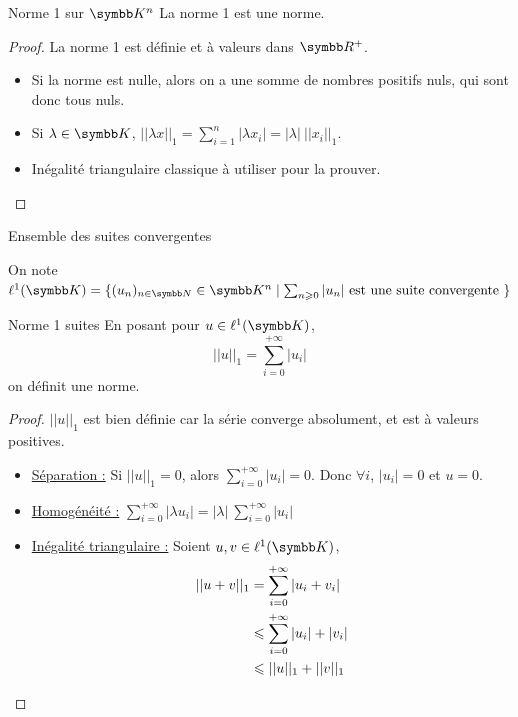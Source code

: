 \begin{theoreme}{Norme 1 sur $\K^n$}{}
    La norme 1 est une norme.
\end{theoreme}

\begin{proof}
    La norme 1 est définie et à valeurs dans $\R^+$. 

    \begin{itemize}
        \item Si la norme est nulle, alors on a une somme de nombres positifs nuls, qui sont donc tous nuls. 
        \item Si $\displaystyle \lambda \in \K$, $||\lambda x ||_1 = \sum_{i = 1 }^{n }|\lambda x_i | = |\lambda| ~ ||x_i||_1$.
        \item  Inégalité triangulaire classique à utiliser pour la prouver. 
    \end{itemize}
\end{proof}

\begin{definition}{Ensemble des suites convergentes}{}

    On note $\ell^1(\K) = \{(u_n)_{n \in \N} \in \K^n \mid \sum_{n \geqslant 0} |u_n| ~ \text{est une suite convergente} ~ \}$
\end{definition}

\begin{theoreme}{Norme 1 suites}{}
    En posant pour $u \in \ell^1(\K)$,
    \[||u||_1 = \sum_{i = 0}^{+ \infty }|u_i|\] 
    on définit une norme. 
\end{theoreme}

\begin{proof}
    $|| u ||_1$ est bien définie car la série converge absolument, et est à valeurs positives.

    \begin{itemize}
        \item \uline{Séparation :}
        Si $||u ||_1 = 0$, alors $\displaystyle \sum_{i = 0}^{+ \infty}  |u_i| = 0 $.
        Donc $\forall i$, $|u_i| = 0 $ et $u = 0$. 

        \item \uline{Homogénéité :}
        $\displaystyle \sum_{ i = 0 }^{+ \infty } |\lambda u_i| = |\lambda| ~ \sum_{i = 0 }^{+ \infty } |u_i|$
        
        \item \uline{Inégalité triangulaire :} Soient $u, v \in \ell^1(\K)$,
        \[ \displaystyle
            \begin{aligned}
                ||u + v ||_1 & =  \sum_{i = 0 }^{+ \infty } |u_i + v_i| \\
                \space & \leqslant  \sum_{i = 0}^{+ \infty} |u_i| + |v_i| \\
                \space & \leqslant  ||u||_1 + ||v||_1 \\
            \end{aligned}
        \]
    \end{itemize}
\end{proof}

